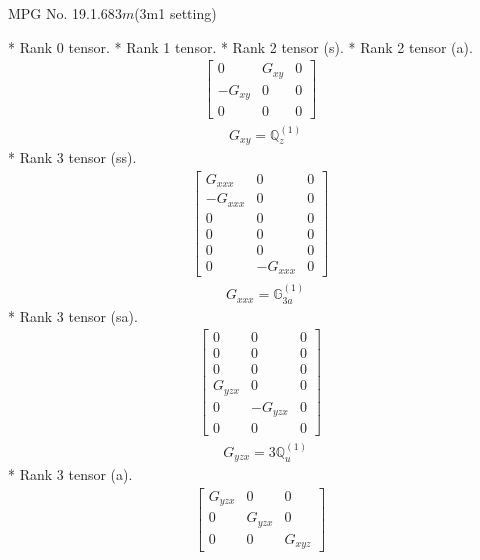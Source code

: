 \documentclass[fleqn,8pt,landscape]{jsarticle}
\begin{document}
\setcounter{MaxMatrixCols}{32}

\renewcommand{\tablename}{Table~}
\renewcommand{\figurename}{Figure~}
\begin{center}
\LARGE
MPG No. 19.1.68\quad$3m$\quad(3m1 setting)
\end{center}
* Rank 0 tensor.
* Rank 1 tensor.
* Rank 2 tensor (s).
* Rank 2 tensor (a).
\begin{align*}
\begin{bmatrix} 0 & G_{xy} & 0 \\ - G_{xy} & 0 & 0 \\ 0 & 0 & 0 \end{bmatrix}
\end{align*}
\begin{align*}
& G_{xy} = \mathbb{Q}_{z}^{(1)}
\end{align*}
* Rank 3 tensor (ss).
\begin{align*}
\begin{bmatrix} G_{xxx} & 0 & 0 \\ - G_{xxx} & 0 & 0 \\ 0 & 0 & 0 \\ 0 & 0 & 0 \\ 0 & 0 & 0 \\ 0 & - G_{xxx} & 0 \end{bmatrix}
\end{align*}
\begin{align*}
& G_{xxx} = \mathbb{G}_{3a}^{(1)}
\end{align*}
* Rank 3 tensor (sa).
\begin{align*}
\begin{bmatrix} 0 & 0 & 0 \\ 0 & 0 & 0 \\ 0 & 0 & 0 \\ G_{yzx} & 0 & 0 \\ 0 & - G_{yzx} & 0 \\ 0 & 0 & 0 \end{bmatrix}
\end{align*}
\begin{align*}
& G_{yzx} = 3 \mathbb{Q}_{u}^{(1)}
\end{align*}
* Rank 3 tensor (a).
\begin{align*}
\begin{bmatrix} G_{yzx} & 0 & 0 \\ 0 & G_{yzx} & 0 \\ 0 & 0 & G_{xyz} \end{bmatrix}
\end{align*}
\end{document}
